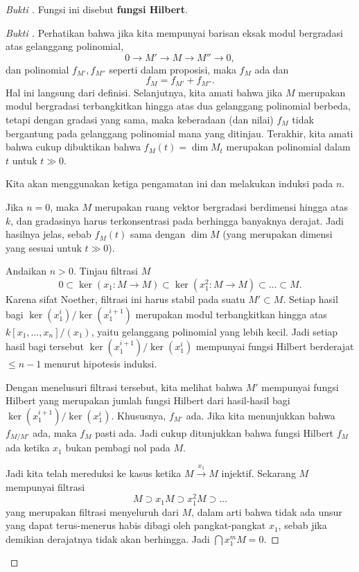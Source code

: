\begin{proof}[Bukti ]
Fungsi ini disebut \textbf{fungsi Hilbert}.

\begin{proof}[Bukti ]
Perhatikan bahwa jika kita mempunyai barisan eksak modul bergradasi atas gelanggang
polinomial,
\[ 0 \to M' \to M \to M'' \to 0,   \]
dan polinomial $f_{M'}, f_{M''}$ seperti dalam proposisi, maka $f_M$ ada dan 
\[ f_M = f_{M'} + f_{M''}.  \] Hal ini langsung dari definisi.
Selanjutnya, kita amati bahwa jika $M$ merupakan modul bergradasi terbangkitkan hingga atas dua
gelanggang polinomial berbeda, tetapi dengan gradasi yang sama, maka keberadaan (dan
nilai) $f_M$ tidak bergantung pada gelanggang polinomial mana yang ditinjau.
Terakhir, kita amati bahwa cukup dibuktikan bahwa $f_M(t) = \dim M_t$ merupakan
polinomial dalam $t$ untuk $t \gg 0$.

Kita akan
menggunakan ketiga pengamatan ini dan melakukan induksi pada $n$.

Jika $n  = 0$, maka $M$ merupakan ruang vektor bergradasi berdimensi hingga atas
$k$, dan gradasinya harus terkonsentrasi pada berhingga banyaknya derajat. Jadi
hasilnya jelas, sebab $f_{M}(t)$ sama dengan $\dim M$ (yang merupakan
dimensi yang sesuai untuk $t \gg 0$). 

Andaikan $n > 0$. Tinjau
filtrasi $M$
\[ 0 \subset \ker( x_1: M \to M) \subset \ker (x_1^2: M \to M) \subset \dots
\subset M.  \]
Karena sifat Noether, filtrasi ini harus stabil pada suatu $M' \subset M$. Setiap
hasil bagi $\ker( x_1^i)/\ker (x_1^{i+1})$ merupakan modul terbangkitkan hingga atas
$k[x_1, \dots,
x_n]/(x_1)$, yaitu gelanggang polinomial yang lebih kecil. Jadi setiap hasil bagi tersebut
$\ker (x_1^{i+1})/\ker (x_1^{i})$ mempunyai fungsi Hilbert berderajat $\leq n-1$ menurut
hipotesis induksi. 

Dengan menelusuri filtrasi tersebut, kita melihat bahwa $M'$ mempunyai fungsi Hilbert yang merupakan jumlah fungsi Hilbert
dari hasil-hasil bagi $\ker(x_1^{i+1})/\ker(x_1^{i})$. Khususnya, $f_{M'}$ ada. Jika kita menunjukkan bahwa $f_{M/M'}$
ada, maka $f_M$ pasti ada. Jadi cukup ditunjukkan bahwa
fungsi Hilbert $f_M$ ada ketika $x_1$ bukan pembagi nol pada $M$. 

Jadi kita telah mereduksi ke kasus ketika $M \stackrel{x_1}{\to} M$
injektif.
Sekarang $M$ mempunyai filtrasi
\[ M \supset x_1 M \supset x_1^2 M \supset \dots  \]
yang merupakan filtrasi menyeluruh dari $M$, dalam arti bahwa tidak ada unsur yang dapat terus-menerus habis dibagi oleh
pangkat-pangkat $x_1$, sebab jika demikian derajatnya tidak akan berhingga. Jadi
$\bigcap x_1^m M = 0$. 


\end{proof}
\end{proof}
